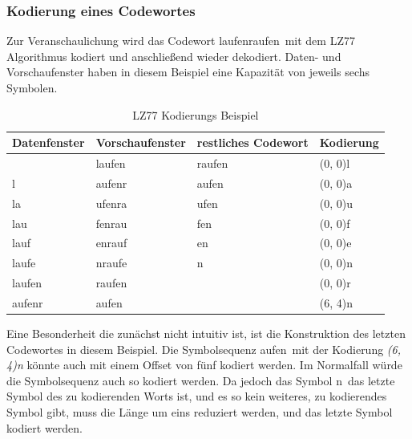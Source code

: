 \subsubsection{Kodierung eines Codewortes}
\label{subsubsec:kodierung_codewort}
Zur Veranschaulichung wird das Codewort \glqq laufenraufen\grqq\ mit dem LZ77 Algorithmus kodiert und anschließend wieder dekodiert.
Daten- und Vorschaufenster haben in diesem Beispiel eine Kapazität von jeweils sechs Symbolen. \newpage
\begin{table}[H]
\centering
\begin{tabular}{|l|l|l|l|}
\hline
\textbf{Datenfenster} & \textbf{Vorschaufenster} & \textbf{restliches Codewort} & \textbf{Kodierung} \\ \hline
                      & laufen                   & raufen                       & (0, 0)l            \\ \hline
l                     & aufenr                   & aufen                        & (0, 0)a            \\ \hline
la                    & ufenra                   & ufen                         & (0, 0)u            \\ \hline
lau                   & fenrau                   & fen                          & (0, 0)f            \\ \hline
lauf                  & enrauf                   & en                           & (0, 0)e            \\ \hline
laufe                 & nraufe                   & n                            & (0, 0)n            \\ \hline
laufen                & raufen                   &                              & (0, 0)r            \\ \hline
aufenr                & aufen                    &                              & (6, 4)n            \\ \hline
\end{tabular}
\label{tab:lz77_encode_table}
\caption{LZ77 Kodierungs Beispiel}
\end{table}

Eine Besonderheit die zunächst nicht intuitiv ist, ist die Konstruktion des letzten Codewortes in diesem Beispiel.
Die Symbolsequenz \glqq aufen\grqq\ mit der Kodierung \textit{(6, 4)n} könnte auch mit einem Offset von fünf kodiert werden.
Im Normalfall würde die Symbolsequenz auch so kodiert werden.
Da jedoch das Symbol \glqq n\grqq\ das letzte Symbol des zu kodierenden Worts ist, und es so kein weiteres, zu kodierendes Symbol gibt, muss die Länge um eins reduziert werden, und das letzte Symbol kodiert werden. \newline

